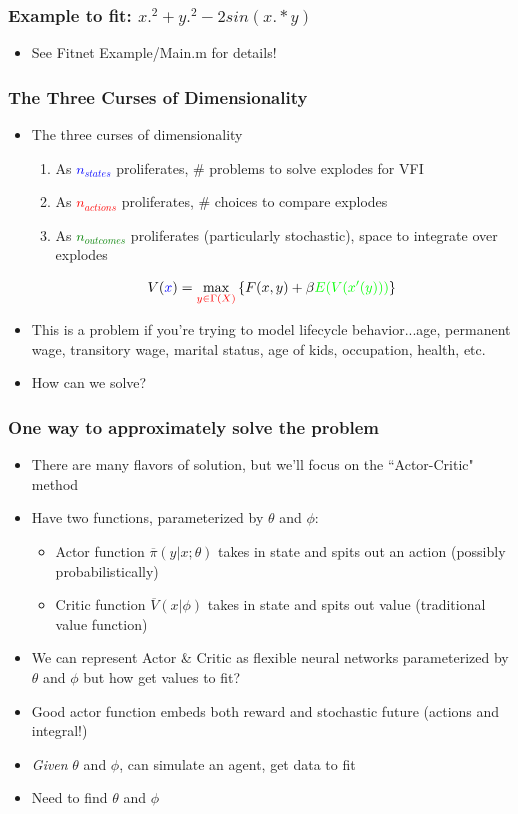 \documentclass{beamer}
\begin{document}
\begin{frame}
\frametitle[alignment=center]{Example to fit:  $x.^2+y.^2-2sin(x.*y)$}
\begin{itemize}
\item See Fitnet Example/Main.m for details!
\end{itemize}
\end{frame}


\begin{frame}
\frametitle[alignment=center]{The Three Curses of Dimensionality}
\begin{itemize}
\item The three curses of dimensionality
\bigskip
\begin{enumerate}
\item As \textcolor{blue}{$n_{states}$} proliferates, \# problems to solve explodes for VFI
\smallskip
\item As \textcolor{red}{$n_{actions}$} proliferates, \# choices to compare explodes
\smallskip
\item As \textcolor{green}{$n_{outcomes}$} proliferates (particularly stochastic), space to integrate over explodes
\end{enumerate}
$$V(\textcolor{blue}{x})=\max_{\textcolor{red}{y\in\Gamma(X)}}\left\{F(x,y)+\beta \textcolor{green}{E(V(x'(y)))}\right\}$$
\item This is a problem if you're trying to model lifecycle behavior...age, permanent wage, transitory wage, marital status, age of kids, occupation, health, etc.
\bigskip
\item How can we solve?
\end{itemize}
\end{frame}


\begin{frame}
\frametitle[alignment=center]{One way to approximately solve the problem}
\begin{itemize}
\item There are many flavors of solution, but we'll focus on the ``Actor-Critic" method
\bigskip
\item Have two functions, parameterized by $\theta$ and $\phi$:
\begin{itemize}
\item Actor function $\overline{\pi}(y|x;\theta)$ takes in state and spits out an action (possibly probabilistically)
\bigskip
\item Critic function $\overline{V}(x|\phi)$  takes in state and spits out value (traditional value function)
\end{itemize}
\bigskip
\item We can represent Actor \& Critic as flexible neural networks parameterized by $\theta$ and $\phi$ but how get values to fit?
\bigskip
\item Good actor function embeds both reward and stochastic future (actions and integral!)
\bigskip
\item \emph{Given} $\theta$ and $\phi$, can simulate an agent, get data to fit
\bigskip
\item Need to find $\theta$ and $\phi$
\end{itemize}
\end{frame}
\end{document}
